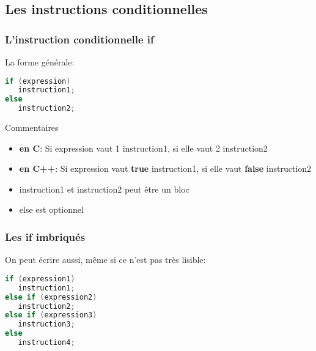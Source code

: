 \documentclass{beamer}
\begin{document}
\subsection{Les instructions conditionnelles}

\begin{frame}[fragile=singleslide,shrink=20]
\frametitle {L'instruction conditionnelle if}

La forme générale:
\begin{lstlisting}[language=c++]
if (expression) 
   instruction1;
else
   instruction2;
\end{lstlisting}

\begin{block}{Commentaires}
\begin{itemize}
\item{\textbf{en C}: Si expression vaut 1 instruction1, si elle vaut 2 instruction2}
\item{\textbf{en C++}: Si expression vaut \textbf{true} instruction1, si elle vaut \textbf{false} instruction2}
\item{instruction1 et instruction2 peut être un bloc}
\item{else est optionnel}
\end{itemize}
\end{block}
\end{frame}

\begin{frame}[fragile=singleslide,shrink=20]
\frametitle {Les if imbriqués}

On peut écrire aussi, même si ce n'est pas très lisible:
\begin{lstlisting}[language=c++]
if (expression1) 
   instruction1;
else if (expression2)
   instruction2;
else if (expression3)
   instruction3;
else
   instruction4;
\end{lstlisting}
\end{frame}
\end{document}
